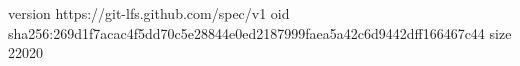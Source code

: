 version https://git-lfs.github.com/spec/v1
oid sha256:269d1f7acac4f5dd70c5e28844e0ed2187999faea5a42c6d9442dff166467c44
size 22020
